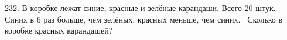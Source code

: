 232. В коробке лежат синие, красные и зелёные карандаши. Всего 20 штук. Синих в 6 раз больше, чем зелёных, красных меньше, чем синих. 
Сколько в коробке красных карандашей?\\
